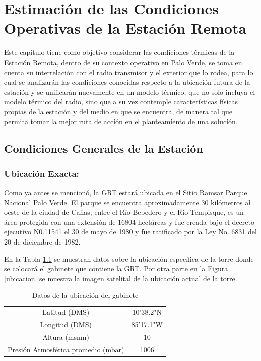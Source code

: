\chapter{Estimación de las Condiciones Operativas de la Estación Remota}

Este capítulo tiene como objetivo considerar las condiciones térmicas de la Estación Remota, dentro de su contexto operativo en Palo Verde, se toma en cuenta su interrelación con el radio transmisor y el exterior que lo rodea, para lo cual se analizarán las condiciones conocidas respecto a la ubicación futura de la estación y se unificarán nuevamente en un modelo térmico, que no solo incluya el modelo térmico del radio, sino que a su vez contemple características físicas propias de la estación y del medio en que se encuentra, de manera tal que permita tomar la mejor ruta de acción en el planteamiento de una solución.

\section{Condiciones Generales de la Estación}

\subsection{Ubicación Exacta:}

Como ya antes se mencionó, la GRT estará ubicada en el Sitio Ramsar Parque Nacional Palo Verde. El parque se encuentra aproximadamente 30 kilómetros al oeste de la ciudad de Cañas, entre el Río Bebedero y el Río Tempisque,  es un área protegida con una extensión de 16804 hectáreas y fue creada bajo el decreto ejecutivo N0.11541 el 30 de mayo de 1980 y fue ratificado por la Ley No. 6831 del 20 de diciembre de 1982. \cite{paloverde}

En la Tabla \ref{cordenadas} se muestran datos sobre la ubicación específica de la torre donde se colocará  el gabinete que contiene la GRT. Por otra parte en  la Figura \ref{ubicacion} se muestra la imagen satelital de la ubicación actual de la torre.

\begin{table}[H]
\centering
\caption{Datos de la ubicación del gabinete}
\label{cordenadas}
\begin{tabular}{cc}
\toprule
Latitud (DMS) &  10\degree20'38.2"N \\
Longitud (DMS) & 85\degree20'17.1"W \\
Altura (msnm) & 10\\
Presión Atmosférica promedio (mbar) & 1006 \\ \bottomrule
\end{tabular}
\end{table}

